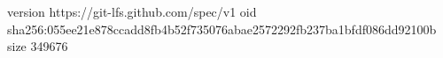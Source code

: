 version https://git-lfs.github.com/spec/v1
oid sha256:055ee21e878ccadd8fb4b52f735076abae2572292fb237ba1bfdf086dd92100b
size 349676
